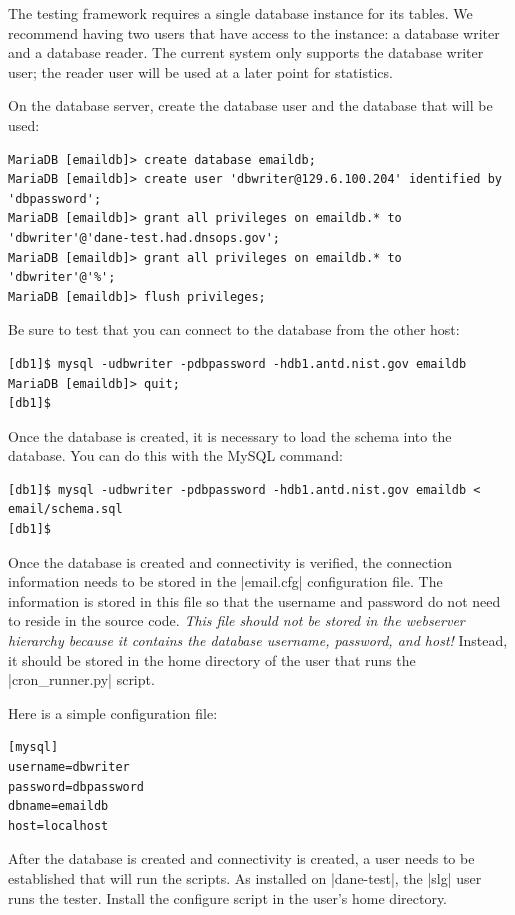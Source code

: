 \documentclass[preprint,3p]{elsarticle}
\begin{document}
The testing framework requires a single database instance for its
tables. We recommend having two users that have access to the
instance: a database writer and a database reader. The current system
only supports the database writer user; the reader user will be used
at a later point for statistics.

On the database server, create the database user and the database that
will be used:

\begin{Verbatim}
MariaDB [emaildb]> create database emaildb;
MariaDB [emaildb]> create user 'dbwriter@129.6.100.204' identified by 'dbpassword';
MariaDB [emaildb]> grant all privileges on emaildb.* to 'dbwriter'@'dane-test.had.dnsops.gov';
MariaDB [emaildb]> grant all privileges on emaildb.* to 'dbwriter'@'%';
MariaDB [emaildb]> flush privileges;
\end{Verbatim}

Be sure to test that you can connect to the database from the other host:

\begin{Verbatim}
[db1]$ mysql -udbwriter -pdbpassword -hdb1.antd.nist.gov emaildb
MariaDB [emaildb]> quit;
[db1]$ 
\end{Verbatim}

Once the database is created, it is necessary to load the schema into
the database. You can do this with the MySQL command:

\begin{Verbatim}
[db1]$ mysql -udbwriter -pdbpassword -hdb1.antd.nist.gov emaildb < email/schema.sql
[db1]$
\end{Verbatim}

Once the database is created and connectivity is verified, the
connection information needs to be stored in the 
|email.cfg| configuration file. The information is stored in this file
so that the username and password do not need to reside in the source
code. \emph{This file should not be stored in the webserver
  hierarchy because it contains the database username, password, and
  host!} Instead, it should be stored in the home directory of the
user that runs the |cron_runner.py| script.

Here is a simple configuration file:

\begin{lstlisting}
[mysql]
username=dbwriter
password=dbpassword
dbname=emaildb
host=localhost
\end{lstlisting}

After the database is created and connectivity is created, a user
needs to be established that will run the scripts. As installed on
|dane-test|, the |slg| user runs the tester.   Install the configure
script in the user's home directory.
\end{document}
